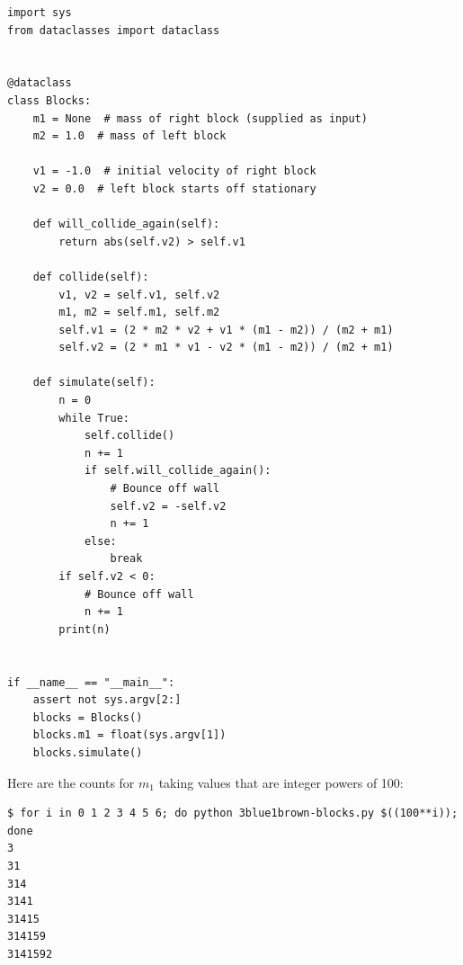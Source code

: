 \begin{verbatim}
import sys
from dataclasses import dataclass


@dataclass
class Blocks:
    m1 = None  # mass of right block (supplied as input)
    m2 = 1.0  # mass of left block

    v1 = -1.0  # initial velocity of right block
    v2 = 0.0  # left block starts off stationary

    def will_collide_again(self):
        return abs(self.v2) > self.v1

    def collide(self):
        v1, v2 = self.v1, self.v2
        m1, m2 = self.m1, self.m2
        self.v1 = (2 * m2 * v2 + v1 * (m1 - m2)) / (m2 + m1)
        self.v2 = (2 * m1 * v1 - v2 * (m1 - m2)) / (m2 + m1)

    def simulate(self):
        n = 0
        while True:
            self.collide()
            n += 1
            if self.will_collide_again():
                # Bounce off wall
                self.v2 = -self.v2
                n += 1
            else:
                break
        if self.v2 < 0:
            # Bounce off wall
            n += 1
        print(n)


if __name__ == "__main__":
    assert not sys.argv[2:]
    blocks = Blocks()
    blocks.m1 = float(sys.argv[1])
    blocks.simulate()
\end{verbatim}

Here are the counts for $m_1$ taking values that are integer powers of 100:

\begin{verbatim}
$ for i in 0 1 2 3 4 5 6; do python 3blue1brown-blocks.py $((100**i)); done
3
31
314
3141
31415
314159
3141592
\end{verbatim}


